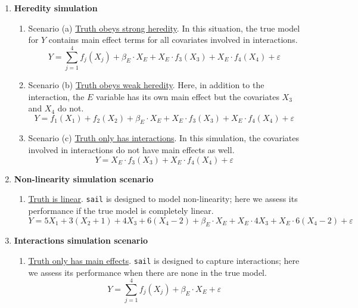 \documentclass[a4paper,fleqn]{cas-sc}
\begin{document}
\begin{enumerate}
	\item \textbf{Heredity simulation}
	\begin{enumerate}
		\item[] Scenario (a) \underline{Truth obeys strong heredity}. In this situation, the true model for $Y$ contains main effect terms for all covariates involved in interactions. \[Y = \sum_{j=1}^{4} f_j(X_{j}) + \beta_E \cdot X_{E} +  X_{E} \cdot f_3(X_{3}) + X_{E} \cdot f_4(X_{4}) + \varepsilon\]
		\item[] Scenario (b) \underline{Truth obeys weak heredity}. Here, in addition to the interaction, the $E$ variable has its own main effect but the covariates $X_3$ and $X_4$ do not.
		\[Y = f_1(X_{1}) + f_2(X_{2}) + \beta_E \cdot X_{E} +  X_{E} \cdot f_3(X_{3}) + X_{E} \cdot f_4(X_{4}) + \varepsilon\]
		\item[] Scenario (c) \underline{Truth only has interactions}. In this simulation, the covariates involved in interactions do not have main effects as well.  \[Y =  X_{E} \cdot f_3(X_{3}) + X_{E} \cdot f_4(X_{4}) + \varepsilon\]
	\end{enumerate}
	
	\item \textbf{Non-linearity simulation scenario}
	\begin{enumerate}
		\item[] \underline{Truth is linear}. \texttt{sail} is designed to model non-linearity; here we assess its performance if the true model is completely linear. \[Y = 5X_1 + 3(X_2 + 1) + 4X_3 + 6(X_4-2) + \beta_E \cdot X_{E} +  X_{E} \cdot 4X_3 + X_{E} \cdot 6(X_4-2) + \varepsilon\]
	\end{enumerate}
	
	\item \textbf{Interactions simulation scenario}
	\begin{enumerate}
		
		\item[] \underline{Truth only has main effects}. \texttt{sail} is designed to capture interactions; here we assess its performance when there are none in the true model. \[Y = \sum_{j=1}^{4} f_j(X_{j}) + \beta_E \cdot X_{E} + \varepsilon\]
	\end{enumerate}
	
	
\end{enumerate}
\end{document}
